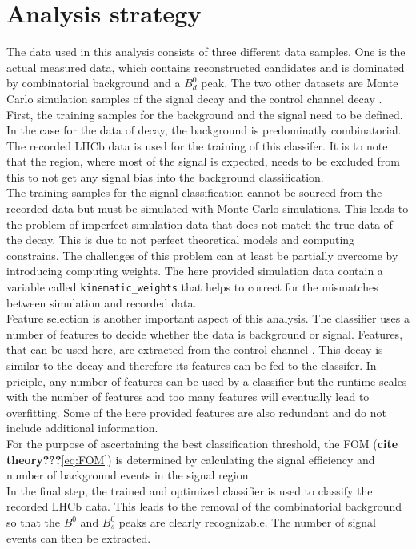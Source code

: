 \section{Analysis strategy}
\label{sec:strategy}
The data used in this analysis consists of three different data samples. One is the actual measured data, which contains reconstructed \printBtoPsiKs \: candidates
and is dominated by combinatorial background and a $B^0_d$ peak. The two other datasets are Monte Carlo simulation samples of the signal decay \printBstoPsiKs \: 
and the control channel decay \printBdtoPsiKs. \\
First, the training samples for the background and the signal need to be defined. In the case for the data of \printBdtoPsiKs \: decay, the background is predominatly combinatorial. The recorded LHCb 
data is used for the training of this classifer. It is to note that the region, where most of the signal is expected, needs to be excluded from this to not get any signal bias into the background classification. \\
The training samples for the signal classification cannot be sourced from the recorded data but must be simulated with Monte Carlo simulations. This leads to the problem of imperfect simulation data 
that does not match the true data of the decay. This is due to not perfect theoretical models and computing constrains. The challenges of this problem can at least be partially overcome by introducing 
computing weights. The here provided simulation data contain a variable called \texttt{kinematic\_weights} that helps to correct for the mismatches between simulation and recorded data. \\
Feature selection is another important aspect of this analysis. The classifier uses a number of features to decide whether the data is background or signal. Features, that can be used here, are extracted
from the control channel \printBtoPsiKs. This decay is similar to the decay \printBstoPsiKs \: and therefore its features can be fed to the classifer.
In priciple, any number of features can be used by a classifier but the runtime scales with the number of features and too many features will eventually lead to overfitting. Some of the here provided features
are also redundant and do not include additional information. \\
For the purpose of ascertaining the best classification threshold, the FOM (\textbf{cite theory???}\eqref{eq:FOM}) is determined by calculating the signal efficiency and number of background events
in the signal region. \\
In the final step, the trained and optimized classifier is used to classify the recorded LHCb data. This leads to the removal of the combinatorial background so that the $B^0$ and $B^0_s$ peaks are clearly
recognizable. The number of signal events can then be extracted. 
